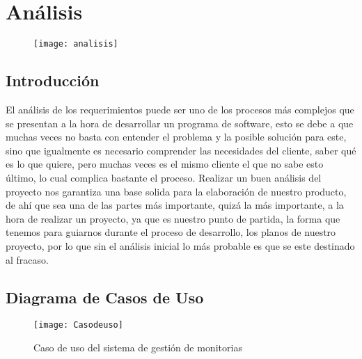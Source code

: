 \chapter{Análisis}
\begin{figure}[th!]
	\centering
	\texttt{[image: analisis]}
\end{figure}
\section{Introducción}
El análisis de los requerimientos puede ser uno de los procesos más complejos que se presentan a la hora de desarrollar un programa de software, esto se debe a que muchas veces no basta con entender el problema y la posible solución para este, sino que igualmente es necesario comprender las necesidades del cliente, saber qué es lo que quiere, pero muchas veces es el mismo cliente el que no sabe esto último, lo cual complica bastante el proceso.
\newline
\newline
Realizar un buen análisis del proyecto nos garantiza una base solida para la elaboración de nuestro producto, de ahí que sea una de las partes más importante, quizá la más importante, a la hora de realizar un proyecto, ya que es nuestro punto de partida, la forma que tenemos para guiarnos durante el proceso de desarrollo, los planos de nuestro proyecto, por lo que sin el análisis inicial lo más probable es que se este destinado al fracaso.
\newpage

\section{Diagrama de Casos de Uso}

\begin{figure}[th!]
	\centering
	\texttt{[image: Casodeuso]}
    \caption{Caso de uso del sistema de gestión de monitorias}
	\label{fig:Casodeuso}
\end{figure}

